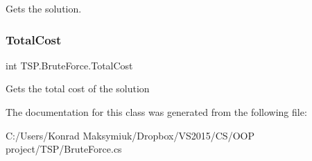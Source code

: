 Gets the solution. 

\mbox{\label{class_t_s_p_1_1_brute_force_a82ef137f4c0ab7386b45a2e56a8ea5cf}} 
\subsubsection{\texorpdfstring{Total\+Cost}{TotalCost}}
{\footnotesize\ttfamily int T\+S\+P.\+Brute\+Force.\+Total\+Cost\hspace{0.3cm}{\ttfamily [get]}}



Gets the total cost of the solution 



The documentation for this class was generated from the following file\+:\begin{DoxyCompactItemize}
\item 
C\+:/\+Users/\+Konrad Maksymiuk/\+Dropbox/\+V\+S2015/\+C\+S/\+O\+O\+P project/\+T\+S\+P/Brute\+Force.\+cs\end{DoxyCompactItemize}
